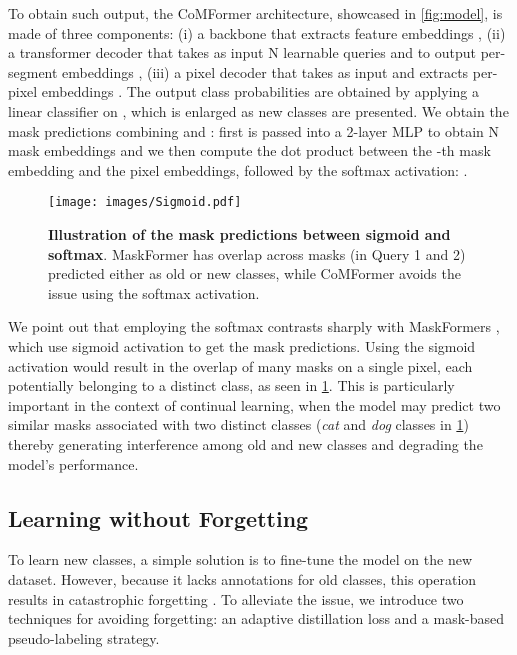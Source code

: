 \documentclass[10pt,twocolumn,letterpaper]{article}
\begin{document}
To obtain such output, the CoMFormer architecture, showcased in \autoref{fig:model}, is made of three components: (i) a backbone that extracts feature embeddings , (ii) a transformer decoder that takes as input N learnable queries and  to output  per-segment embeddings , (iii) a pixel decoder that takes  as input and extracts per-pixel embeddings . The output class probabilities  are obtained by applying a linear classifier on , which is enlarged as new classes are presented. We obtain the mask predictions  combining  and : first  is passed into a 2-layer MLP to obtain N mask embeddings  and we then compute the dot product between the -th mask embedding and the pixel embeddings, followed by the softmax activation: .

\begin{figure}[t]
    \texttt{[image: images/Sigmoid.pdf]}
    \caption{\textbf{Illustration of the mask predictions between sigmoid and softmax}. MaskFormer has overlap across masks (\eg in Query 1 and 2) predicted either as old or new classes, while CoMFormer avoids the issue using the softmax activation.}
    \label{fig:softmask} \vspace{-1em}
\end{figure}

We point out that employing the softmax contrasts sharply with MaskFormers \cite{cheng2021maskformer, cheng2021masked}, which use sigmoid activation to get the mask predictions. Using the sigmoid activation would result in the overlap of many masks on a single pixel, each potentially belonging to a distinct class, as seen in \cref{fig:softmask}. This is particularly important in the context of continual learning, when the model may predict two similar masks associated with two distinct classes (\eg \textit{cat} and \textit{dog} classes in \cref{fig:softmask}) thereby generating interference among old and new classes and degrading the model's performance.


\subsection{Learning without Forgetting} \label{sec:lwf}
To learn new classes, a simple solution is to fine-tune the model on the new dataset. However, because it lacks annotations for old classes, this operation results in catastrophic forgetting \cite{french1999catastrophicforgetting}. To alleviate the issue, we introduce two techniques for avoiding forgetting: an adaptive distillation loss and a mask-based pseudo-labeling strategy.
\end{document}
